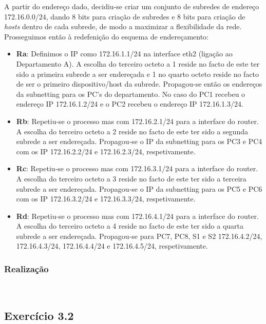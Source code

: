 \documentclass{llncs}
\begin{document}
\par A partir do endereço dado, decidiu-se criar um conjunto de subredes de endereço 172.16.0.0/24, dando 8 bits para criação de subredes e 8 bits para criação de \textit{hosts} dentro de cada subrede, de modo a maximizar a flexibilidade da rede. Prosseguimos então à redefenição do esquema de endereçamento:
\begin{itemize}
\item \textbf{Ra}: Definimos o IP como 172.16.1.1/24 na interface eth2 (ligação ao Departamento A). A escolha do terceiro octeto a 1 reside no facto de este ter sido a primeira subrede a ser endereçada e 1 no quarto octeto reside no facto de ser o primeiro dispositivo/host da subrede. Propagou-se então os endereços da subnetting para os PC's do departamento. No caso do PC1 recebeu o endereço IP 172.16.1.2/24 e o PC2 recebeu o endereço IP 172.16.1.3/24.

\item \textbf{Rb}: Repetiu-se o processo mas com 172.16.2.1/24 para a interface do router. A escolha do terceiro octeto a 2 reside no facto de este ter sido a segunda subrede a ser endereçada. Propagou-se o IP da subnetting para os PC3 e PC4 com os IP 172.16.2.2/24 e 172.16.2.3/24, respetivamente.

\item \textbf{Rc}: Repetiu-se o processo mas com 172.16.3.1/24 para a interface do router. A escolha do terceiro octeto a 3 reside no facto de este ter sido a terceira subrede a ser endereçada. Propagou-se o IP da subnetting para os PC5 e PC6 com os IP 172.16.3.2/24 e 172.16.3.3/24, respetivamente.

\item \textbf{Rd}: Repetiu-se o processo mas com 172.16.4.1/24 para a interface do router. A escolha do terceiro octeto a 4 reside no facto de este ter sido a quarta subrede a ser endereçada. Propagou-se para PC7, PC8, S1 e S2 172.16.4.2/24, 172.16.4.3/24, 172.16.4.4/24 e 172.16.4.5/24, respetivamente.

\end{itemize}

\subsubsection{Realização}\rule[-10pt]{0pt}{10pt}\\



\subsection{Exercício 3.2}
\end{document}

